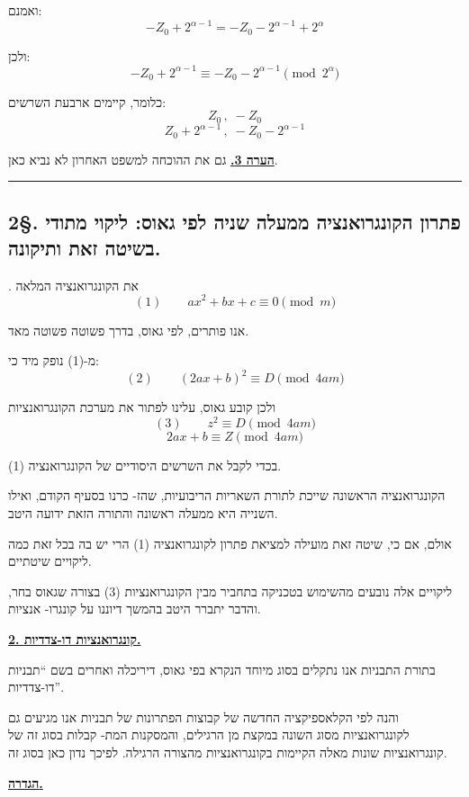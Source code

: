 \noindent ואמנם:
\[ -Z_0 + 2^{\alpha-1} = -Z_0 - 2^{\alpha-1} + 2^{\alpha} \]

\noindent ולכן:
\[ -Z_0 + 2^{\alpha-1} \equiv -Z_0 - 2^{\alpha-1} \pmod{2^{\alpha}} \]

\noindent כלומר, קיימים ארבעת השרשים:
\[ Z_0 \, , \; -Z_0 \]
\[ Z_0 + 2^{\alpha-1} \, , \; -Z_0 - 2^{\alpha-1} \]

\noindent\textbf{\underline{הערה 3.}} גם את ההוכחה למשפט האחרון לא נביא כאן.

\bigskip
\hrule
\bigskip

\subsection*{2\S. פתרון הקונגרואנציה ממעלה שניה לפי גאוס:
ליקוי מתודי בשיטה זאת ותיקונה.}

. את הקונגרואנציה המלאה
\[ (1) \qquad ax^2 + bx + c \equiv 0 \pmod{m} \]

\noindent אנו פותרים, לפי גאוס, בדרך פשוטה פשוטה מאד.

\noindent מ-(1) נופק מיד כי:
\[ (2) \qquad (2ax+b)^2 \equiv D \pmod{4am} \]

\noindent ולכן קובע גאוס, עלינו לפתור את מערכת הקונגרואנציות
\[ (3) \qquad z^2 \equiv D \pmod{4am} \]
\[ 2ax + b \equiv Z \pmod{4am} \]

\noindent בכדי לקבל את השרשים היסודיים של הקונגרואנציה (1).

\noindent הקונגרואנציה הראשונה שייכת לתורת השאריות הריבועיות, שהז-
כרנו בסעיף הקודם, ואילו השנייה היא ממעלה ראשונה והתורה הזאת
ידועה היטב.

\noindent אולם, אם כי, שיטה זאת מועילה למציאת פתרון לקונגרואנציה
(1) הרי יש בה בכל זאת כמה ליקויים שיטתיים.

\noindent ליקויים אלה נובעים מהשימוש בטכניקה בתחביר מבין הקונגרואנציות (3)
בצורה שגאוס בחר, והדבר יתברר היטב בהמשך דיוננו על קונגרו-
אנציות.

\medskip
\noindent\textbf{\underline{2. קונגרואנציות דו-צדדיות.}}

\noindent בתורת התבניות אנו נתקלים בסוג מיוחד הנקרא בפי גאוס, דיריכלה
ואחרים בשם ``תבניות דו-צדדיות''.

\noindent והנה לפי הקלאספיקציה החדשה של קבוצות הפתרונות של תבניות אנו
מגיעים גם לקונגרואנציות מסוג השונה במקצת מן הרגילים, והמסקנות המת-
קבלות בסוג זה של קונגרואנציות שונות מאלה הקיימות בקונגרואנציות מהצורה
הרגילה. לפיכך נדון כאן בסוג זה.

\bigskip
\noindent\textbf{\underline{הגדרה.}}

